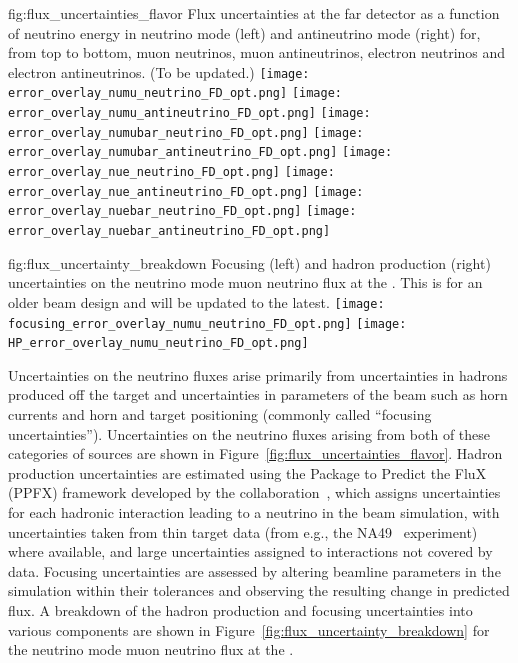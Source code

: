 \begin{dunefigure}{fig:flux_uncertainties_flavor}
{Flux uncertainties at the far detector as a function of neutrino energy in neutrino mode (left) and antineutrino mode (right) for, from top to bottom, muon neutrinos, muon antineutrinos, electron neutrinos and electron antineutrinos. (To be updated.)   }
    \texttt{[image: error\_overlay\_numu\_neutrino\_FD\_opt.png]}
    \texttt{[image: error\_overlay\_numu\_antineutrino\_FD\_opt.png]}
    \texttt{[image: error\_overlay\_numubar\_neutrino\_FD\_opt.png]}
    \texttt{[image: error\_overlay\_numubar\_antineutrino\_FD\_opt.png]}
        \texttt{[image: error\_overlay\_nue\_neutrino\_FD\_opt.png]}
    \texttt{[image: error\_overlay\_nue\_antineutrino\_FD\_opt.png]}
        \texttt{[image: error\_overlay\_nuebar\_neutrino\_FD\_opt.png]}
    \texttt{[image: error\_overlay\_nuebar\_antineutrino\_FD\_opt.png]}
    \end{dunefigure}


\begin{dunefigure}{fig:flux_uncertainty_breakdown}
{Focusing (left) and hadron production (right) uncertainties on the neutrino mode muon neutrino flux at the .  This is for an older beam design and will be updated to the latest.  }
\texttt{[image: focusing\_error\_overlay\_numu\_neutrino\_FD\_opt.png]}
    \texttt{[image: HP\_error\_overlay\_numu\_neutrino\_FD\_opt.png]}\end{dunefigure}

Uncertainties on the neutrino fluxes arise primarily from uncertainties in hadrons produced off the target and uncertainties in parameters of the beam such as horn currents and horn and target positioning (commonly called ``focusing uncertainties'').  Uncertainties on the neutrino fluxes arising from both of these categories of sources are shown in Figure~\ref{fig:flux_uncertainties_flavor}.  Hadron production uncertainties are estimated using the Package to Predict the FluX (PPFX) framework developed by the \minerva collaboration~\cite{Aliaga:2016oaz, AliagaSoplin:2016shs}, which assigns uncertainties for each hadronic interaction leading to a neutrino in the beam simulation, with uncertainties taken from thin target data (from e.g., the NA49~\cite{NA49} experiment) where available, and large uncertainties assigned to interactions not covered by data.  Focusing uncertainties are assessed by altering beamline parameters in the simulation within their tolerances and observing the resulting change in predicted flux.  A breakdown of the hadron production and focusing uncertainties into various components are shown in Figure~\ref{fig:flux_uncertainty_breakdown} for the neutrino mode muon neutrino flux at the .    

